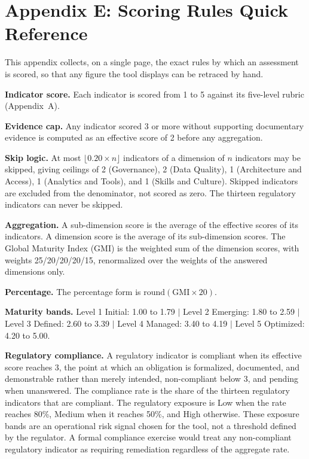 \clearpage
{}
\section*{Appendix E: Scoring Rules Quick Reference}

This appendix collects, on a single page, the exact rules by which an assessment is scored, so that any figure the tool displays can be retraced by hand.

\vspace{0.4em}
\noindent \textbf{Indicator score.} Each indicator is scored from 1 to 5 against its five-level rubric (Appendix~A).

\noindent \textbf{Evidence cap.} Any indicator scored 3 or more without supporting documentary evidence is computed as an effective score of 2 before any aggregation.

\noindent \textbf{Skip logic.} At most $\lfloor 0.20 \times n \rfloor$ indicators of a dimension of $n$ indicators may be skipped, giving ceilings of 2 (Governance), 2 (Data Quality), 1 (Architecture and Access), 1 (Analytics and Tools), and 1 (Skills and Culture). Skipped indicators are excluded from the denominator, not scored as zero. The thirteen regulatory indicators can never be skipped.

\noindent \textbf{Aggregation.} A sub-dimension score is the average of the effective scores of its indicators. A dimension score is the average of its sub-dimension scores. The Global Maturity Index (GMI) is the weighted sum of the dimension scores, with weights 25/20/20/20/15, renormalized over the weights of the answered dimensions only.

\noindent \textbf{Percentage.} The percentage form is $\mathrm{round}(\mathrm{GMI} \times 20)$.

\vspace{0.5em}
\noindent \textbf{Maturity bands.} \quad
Level 1 Initial: 1.00 to 1.79 \quad$\vert$\quad
Level 2 Emerging: 1.80 to 2.59 \quad$\vert$\quad
Level 3 Defined: 2.60 to 3.39 \quad$\vert$\quad
Level 4 Managed: 3.40 to 4.19 \quad$\vert$\quad
Level 5 Optimized: 4.20 to 5.00.

\vspace{0.5em}
\noindent \textbf{Regulatory compliance.} A regulatory indicator is compliant when its effective score reaches 3, the point at which an obligation is formalized, documented, and demonstrable rather than merely intended, non-compliant below 3, and pending when unanswered. The compliance rate is the share of the thirteen regulatory indicators that are compliant. The regulatory exposure is Low when the rate reaches 80\%, Medium when it reaches 50\%, and High otherwise. These exposure bands are an operational risk signal chosen for the tool, not a threshold defined by the regulator. A formal compliance exercise would treat any non-compliant regulatory indicator as requiring remediation regardless of the aggregate rate.
